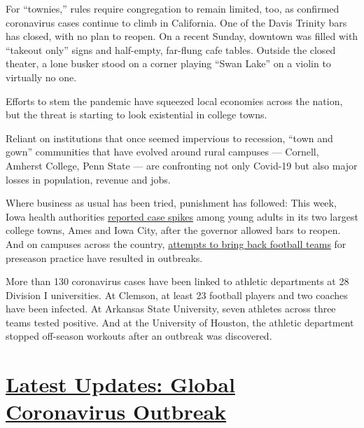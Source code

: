 For ``townies,'' rules require congregation to remain limited, too, as
confirmed coronavirus cases continue to climb in California. One of the
Davis Trinity bars has closed, with no plan to reopen. On a recent
Sunday, downtown was filled with ``takeout only'' signs and half-empty,
far-flung cafe tables. Outside the closed theater, a lone busker stood
on a corner playing ``Swan Lake'' on a violin to virtually no one.

Efforts to stem the pandemic have squeezed local economies across the
nation, but the threat is starting to look existential in college towns.

Reliant on institutions that once seemed impervious to recession, ``town
and gown'' communities that have evolved around rural campuses ---
Cornell, Amherst College, Penn State --- are confronting not only
Covid-19 but also major losses in population, revenue and jobs.

Where business as usual has been tried, punishment has followed: This
week, Iowa health authorities
\href{https://ktiv.com/2020/06/23/virus-cases-spike-among-young-adults-in-iowa-college-towns-2/}{reported
case spikes} among young adults in its two largest college towns, Ames
and Iowa City, after the governor allowed bars to reopen. And on
campuses across the country,
\href{https://www.nytimes.com/2020/06/25/sports/ncaafootball/college-football-coronavirus-cases.html?action=click\&module=Top\%20Stories\&pgtype=Homepage}{attempts
to bring back football teams} for preseason practice have resulted in
outbreaks.

More than 130 coronavirus cases have been linked to athletic departments
at 28 Division I universities. At Clemson, at least 23 football players
and two coaches have been infected. At Arkansas State University, seven
athletes across three teams tested positive. And at the University of
Houston, the athletic department stopped off-season workouts after an
outbreak was discovered.

\hypertarget{latest-updates-global-coronavirus-outbreak}{%
\section{\texorpdfstring{\href{https://www.nytimes.com/2020/08/01/world/coronavirus-covid-19.html?action=click\&pgtype=Article\&state=default\&region=MAIN_CONTENT_1\&context=storylines_live_updates}{Latest
Updates: Global Coronavirus
Outbreak}}{Latest Updates: Global Coronavirus Outbreak}}\label{latest-updates-global-coronavirus-outbreak}}

